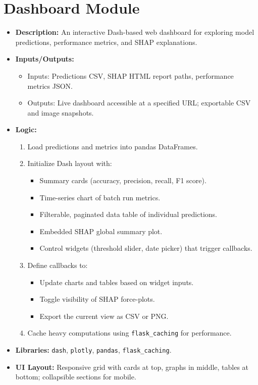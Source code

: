 \documentclass[15pt]{article}
\begin{document}
\section{Dashboard Module}

\begin{itemize}
    \item \textbf{Description:} An interactive Dash-based web dashboard for exploring model predictions, performance metrics, and SHAP explanations.
    \item \textbf{Inputs/Outputs:}
    \begin{itemize}
        \item Inputs: Predictions CSV, SHAP HTML report paths, performance metrics JSON.
        \item Outputs: Live dashboard accessible at a specified URL; exportable CSV and image snapshots.
    \end{itemize}
    \item \textbf{Logic:}
    \begin{enumerate}
        \item Load predictions and metrics into pandas DataFrames.
        \item Initialize Dash layout with:
        \begin{itemize}
            \item Summary cards (accuracy, precision, recall, F1 score).
            \item Time-series chart of batch run metrics.
            \item Filterable, paginated data table of individual predictions.
            \item Embedded SHAP global summary plot.
            \item Control widgets (threshold slider, date picker) that trigger callbacks.
        \end{itemize}
        \item Define callbacks to:
        \begin{itemize}
            \item Update charts and tables based on widget inputs.
            \item Toggle visibility of SHAP force-plots.
            \item Export the current view as CSV or PNG.
        \end{itemize}
        \item Cache heavy computations using \texttt{flask\_caching} for performance.
    \end{enumerate}
    \item \textbf{Libraries:} \texttt{dash}, \texttt{plotly}, \texttt{pandas}, \texttt{flask\_caching}.
    \item \textbf{UI Layout:} Responsive grid with cards at top, graphs in middle, tables at bottom; collapsible sections for mobile.
\end{itemize}
\end{document}
